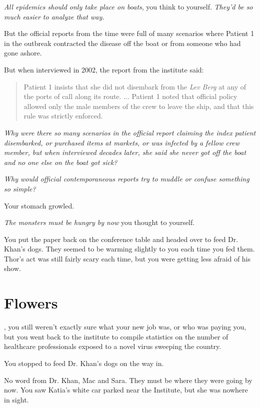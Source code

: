 \documentclass[a5paper, symmetric]{tufte-book}
\begin{document}
\textit{All epidemics should only take place on boats}, you think to yourself. \textit{They'd be so much easier to analyze that way.}

But the official reports from the time were full of many scenarios where Patient 1 in the outbreak contracted the disease off the boat or from someone who had gone ashore.

But when interviewed in 2002, the report from the institute said:

\begin{quote}
 Patient 1 insists that she did not disembark from the \textit{Lev Berg} at any of the ports of call along its route. ... Patient 1 noted that official policy allowed only the male members of the crew to leave the ship, and that this rule was strictly enforced. 
\end{quote}

\textit{Why were there so many scenarios in the official report claiming the index patient disembarked, or purchased items at markets, or was infected by a fellow crew member, but when interviewed decades later, she said she never got off the boat and no one else on the boat got sick?}

\textit{Why would official contemporaneous reports try to muddle or confuse something so simple?}

Your stomach growled.

\textit{The monsters must be hungry by now} you thought to yourself. 

You put the paper back on the conference table and headed over to feed Dr. Khan's dogs. They seemed to be warming slightly to you each time you fed them. Thor's act was still fairly scary each time, but you were getting less afraid of his show. 

\chapter{Flowers}
\label{ch:wednesday}

, you still weren't exactly sure what your new job was, or who was paying you, but you went back to the institute to compile statistics on the number of healthcare professionals exposed to a novel virus sweeping the country. 

You stopped to feed Dr. Khan's dogs on the way in.

No word from Dr. Khan, Mac and Sara. They must be where they were going by now. You saw Katia's white car parked near the Institute, but she was nowhere in sight. 
\end{document}
